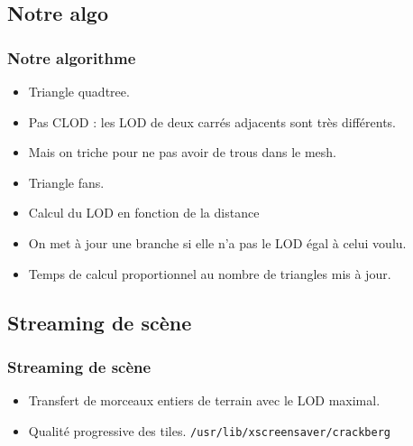 \documentclass{beamer}
\begin{document}
\subsection{Notre algo}
\begin{frame}
  \frametitle{Notre algorithme}
  \begin{itemize}
  \item Triangle quadtree.
  \item Pas CLOD : les LOD de deux carrés adjacents sont très différents.
  \item Mais on triche pour ne pas avoir de trous dans le mesh.
  \item Triangle fans.
  \item Calcul du LOD en fonction de la distance
  \item On met à jour une branche si elle n'a pas le LOD égal à celui voulu.
  \item Temps de calcul proportionnel au nombre de triangles mis à jour.
  \end{itemize}
\end{frame}


\subsection{Streaming de scène}
\begin{frame}
  \frametitle{Streaming de scène}
  \begin{itemize}
  \item Transfert de morceaux entiers de terrain avec le LOD maximal.
  \item Qualité progressive des tiles.
  \texttt{/usr/lib/xscreensaver/crackberg}
  \end{itemize}
\end{frame}


\end{document}
